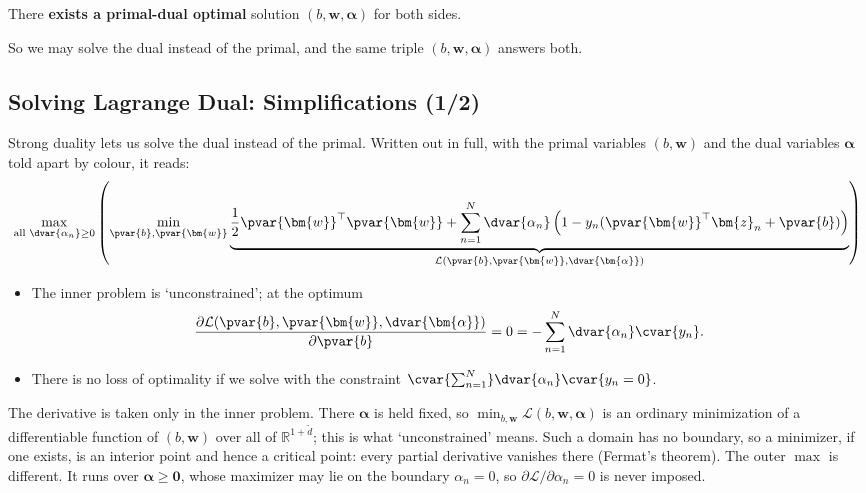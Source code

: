 \begin{moral}
    There \textbf{exists a primal-dual optimal} solution \((b, \bm{w},
    \bm{\alpha})\) for both sides.
\end{moral}

So we may solve the dual instead of the primal, and the same triple
\((b, \bm{w}, \bm{\alpha})\) answers both.

\subsection{Solving Lagrange Dual: Simplifications (1/2)}

Strong duality lets us solve the dual instead of the primal. Written out in
full, with the primal variables \((b, \bm{w})\) and the dual variables
\(\bm{\alpha}\) told apart by colour, it reads:
\[
    \max_{\text{all } \dvar{\alpha_n} \ge 0} \left( \min_{\pvar{b},
    \pvar{\bm{w}}} \underbrace{\frac{1}{2} \pvar{\bm{w}}^\top \pvar{\bm{w}}
    + \sum_{n=1}^N \dvar{\alpha_n} \left( 1 - y_n (\pvar{\bm{w}}^\top
    \bm{z}_n + \pvar{b}) \right)}_{\mathcal{L}(\pvar{b}, \pvar{\bm{w}},
    \dvar{\bm{\alpha}})} \right)
\]

\begin{itemize}
    \item The inner problem is `unconstrained'; at the optimum
        \[
            \frac{\partial \mathcal{L}(\pvar{b}, \pvar{\bm{w}},
            \dvar{\bm{\alpha}})}{\partial \pvar{b}} = 0 = -\sum_{n=1}^N
            \dvar{\alpha_n} \cvar{y_n}.
        \]
    \item There is no loss of optimality if we solve with the constraint
        \(\cvar{\sum_{n=1}^N} \dvar{\alpha_n} \cvar{y_n = 0}\).
\end{itemize}

\begin{remark}
    The derivative is taken only in the inner problem. There \(\bm{\alpha}\)
    is held fixed, so \(\min_{b, \bm{w}} \mathcal{L}(b, \bm{w},
    \bm{\alpha})\) is an ordinary minimization of a differentiable function
    of \((b, \bm{w})\) over all of \(\mathbb{R}^{1 + \tilde{d}}\); this is
    what `unconstrained' means. Such a domain has no boundary, so a
    minimizer, if one exists, is an interior point and hence a critical
    point: every partial derivative vanishes there (Fermat's theorem). The
    outer \(\max\) is different. It runs over \(\bm{\alpha} \ge \bm{0}\),
    whose maximizer may lie on the boundary \(\alpha_n = 0\), so
    \(\partial \mathcal{L} / \partial \alpha_n = 0\) is never imposed.
\end{remark}


